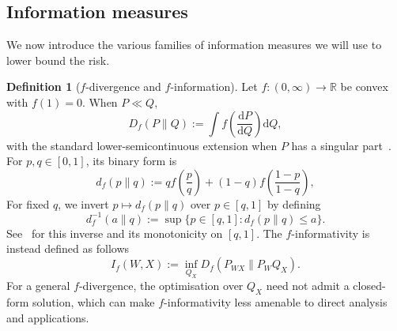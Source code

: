 \documentclass[11pt]{article}
\theoremstyle{definition}
\newtheorem{definition}[theorem]{Definition}
\theoremstyle{remark}
\newcommand{\1}{\boldsymbol{1}}
\begin{document}
\subsection{Information measures}
We now introduce the various families of information measures we will use to lower bound the risk.
\begin{definition}[$f$-divergence and $f$-information]
Let $f:(0,\infty)\to\mathbb R$ be convex with $f(1)=0$.  When $P\ll Q$,
\begin{equation}
D_f(P\|Q)
:=
\int f\left(\frac{\mathrm dP}{\mathrm dQ}\right)\mathrm dQ,
\end{equation}
with the standard lower-semicontinuous extension when $P$ has a singular
part~\cite{AliSilvey1966,Csiszar1967}.  For $p,q\in[0,1]$, its binary form is
\begin{equation}
d_f(p\|q)
:=
qf\left(\frac pq\right)
+(1-q)f\left(\frac{1-p}{1-q}\right),
\end{equation}
For fixed $q$, we invert $p\mapsto d_f(p\|q)$ over $p\in[q,1]$ by defining
\begin{equation}
d_f^{-1}(a\|q)
:=
\sup\{p\in[q,1]:d_f(p\|q)\leq a\}.
\end{equation}
See~\cite[Eq.~(5) and Proposition~1]{MajumdarMeiPacelli2023} for this inverse and its monotonicity on $[q,1]$.
The $f$-informativity is instead defined as follows~\cite{Csiszar1972,ChenGuntuboyinaZhang2016}
\begin{equation}
I_f(W,X)
:=
\inf_{Q_X}D_f(P_{WX}\|P_WQ_X).
\end{equation}
For a general $f$-divergence, the optimisation over $Q_X$ need not admit
a closed-form solution, which can make $f$-informativity less amenable to
direct analysis and applications.
\end{definition}
\end{document}
